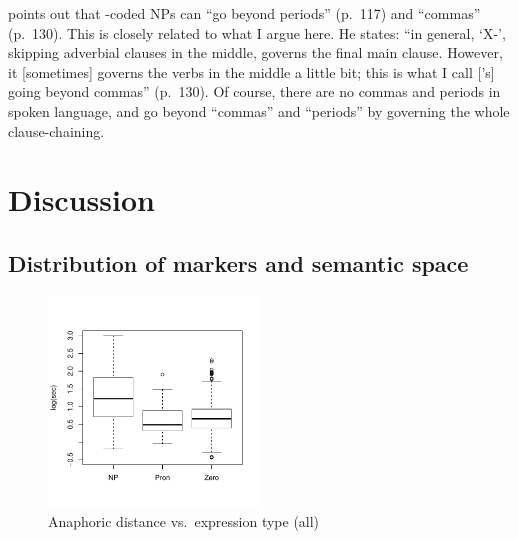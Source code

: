  points out that
-coded NPs can ``go beyond periods'' (p.~117) and ``commas'' (p.~130).
This is closely related to what I argue here.
%
%
He states:
``in general, `X-', skipping adverbial clauses in the middle, governs the final main clause.
However, it [sometimes] governs the verbs in the middle a little bit;
this is what I call ['s] going beyond commas'' (p.~130).
Of course, there are no commas and periods in spoken language,
 and  go beyond ``commas'' and ``periods'' by governing the whole clause-chaining.

\section{Discussion}\label{ParticlesDiscussion}

\subsection{Distribution of markers and semantic space}

\begin{figure}
	\begin{center}
	\includegraphics[width=0.5\textwidth]{figure/DistExpType.pdf}
	\caption{Anaphoric distance vs.\ expression type (all)}
	\label{DistExpTypeF2}
	\end{center}
\end{figure}

